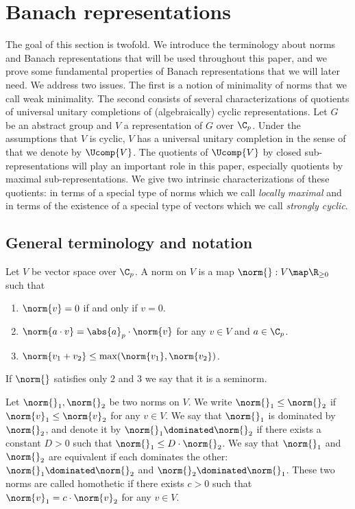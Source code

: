 \section{Banach representations}
The goal of this section is twofold.
We introduce the terminology about norms and Banach representations that will be used throughout this paper, and we prove some fundamental properties of Banach representations that we will later need.
We address two issues.
The first is a notion of minimality of norms that we call weak minimality.
The second consists of several characterizations of quotients of universal unitary completions of (algebraically) cyclic representations.
Let $G$ be an abstract group and $V$ a representation of $G$ over $\C_p$.
Under the assumptions that $V$ is cyclic, $V$ has a universal unitary completion in the sense of \cite{emerton2005p} that we denote by $\Ucomp{V}$.
The quotients of $\Ucomp{V}$ by closed sub-representations will play an important role in this paper, especially quotients by maximal sub-representations.
We give two intrinsic characterizations of these quotients: in terms of a special type of norms which we call \textit{locally maximal} and in terms of the existence of a special type of vectors which we call \textit{strongly cyclic}.

\subsection{General terminology and notation}
Let $V$ be vector space over $\C_p$.
A norm on $V$ is a map $\norm{}:V\map \R_{\geq 0}$ such that 
 \begin{enumerate}
    \item $\norm{v}=0$ if and only if $v=0$.
    \item $\norm{a\cdot v}=\abs{a}_p\cdot \norm{v}$ for any $v\in V$ and $a\in\C_p$.
    \item $\norm{v_1+v_2}\leq \max(\norm{v_1},\norm{v_2})$.
    \end{enumerate}
If $\norm{}$ satisfies only $2$ and $3$ we say that it is a seminorm.

Let $\norm{}_1,\norm{}_2$ be two norms on $V$.
We write $\norm{}_1\leq \norm{}_2$ if $\norm{v}_1\leq \norm{v}_2$ for any $v\in V$.
We say that $\norm{}_1$ is dominated by $\norm{}_2$, and denote it by $\norm{}_1\dominated \norm{}_2$ if there exists a constant $D>0$ such that $\norm{}_1\leq D\cdot \norm{}_2$.
We say that $\norm{}_1$ and $\norm{}_2$ are equivalent if each dominates the other: $\norm{}_1\dominated \norm{}_2$ and $\norm{}_2\dominated \norm{}_1$.
These two norms are called homothetic if there exists $c>0$ such that $\norm{v}_1=c\cdot \norm{v}_2$ for any $v\in V$. 

